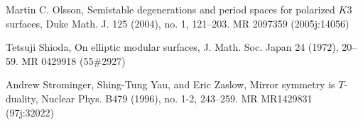 \begin{list}{}{%
  \setlength{\leftmargin}{5.4em}%
  \setlength{\labelwidth}{4.8em}%
  \setlength{\labelsep}{0.6em}%
  \setlength{\itemsep}{1.5pt}%
  \setlength{\parsep}{0pt}}
\item[{[Ols04]}] Martin C. Olsson, Semistable degenerations and period spaces for polarized
  $K3$ surfaces, Duke Math. J. 125 (2004), no. 1, 121–203. MR 2097359 (2005j:14056)
\item[{[Shi72]}] Tetsuji Shioda, On elliptic modular surfaces, J. Math. Soc. Japan 24 (1972),
  20–59. MR 0429918 (55\#2927)
\item[{[SYZ96]}] Andrew Strominger, Shing-Tung Yau, and Eric Zaslow, Mirror symmetry is
  $T$-duality, Nuclear Phys. B479 (1996), no. 1-2, 243–259. MR MR1429831 (97j:32022)
\end{list}

